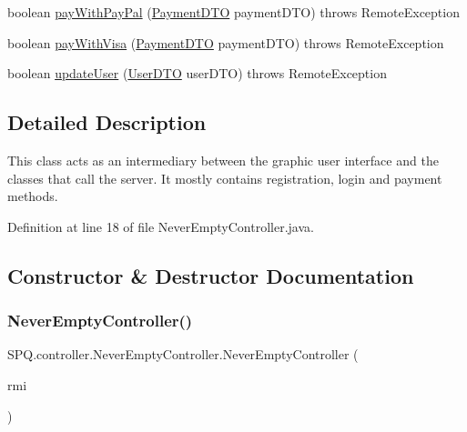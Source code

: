\begin{DoxyCompactItemize}
\item 
boolean \mbox{\hyperlink{class_s_p_q_1_1controller_1_1_never_empty_controller_aefc0dae2c43c2960719176d390f3ad9c}{pay\+With\+Pay\+Pal}} (\mbox{\hyperlink{class_s_p_q_1_1dto_1_1_payment_d_t_o}{Payment\+D\+TO}} payment\+D\+TO)  throws Remote\+Exception 
\item 
boolean \mbox{\hyperlink{class_s_p_q_1_1controller_1_1_never_empty_controller_a79b4d6042b76ad3aee7f11d104d813d6}{pay\+With\+Visa}} (\mbox{\hyperlink{class_s_p_q_1_1dto_1_1_payment_d_t_o}{Payment\+D\+TO}} payment\+D\+TO)  throws Remote\+Exception 
\item 
boolean \mbox{\hyperlink{class_s_p_q_1_1controller_1_1_never_empty_controller_abac74fe36817d476abdd20d19df2092b}{update\+User}} (\mbox{\hyperlink{class_s_p_q_1_1dto_1_1_user_d_t_o}{User\+D\+TO}} user\+D\+TO)  throws Remote\+Exception 
\end{DoxyCompactItemize}


\subsection{Detailed Description}
This class acts as an intermediary between the graphic user interface and the classes that call the server. It mostly contains registration, login and payment methods. 

Definition at line 18 of file Never\+Empty\+Controller.\+java.



\subsection{Constructor \& Destructor Documentation}
\mbox{\label{class_s_p_q_1_1controller_1_1_never_empty_controller_ade8f8a56514a9ef3676a93c79b404be5}} 
\subsubsection{\texorpdfstring{Never\+Empty\+Controller()}{NeverEmptyController()}}
{\footnotesize\ttfamily S\+P\+Q.\+controller.\+Never\+Empty\+Controller.\+Never\+Empty\+Controller (\begin{DoxyParamCaption}\item[{\mbox{\hyperlink{class_s_p_q_1_1remote_1_1_r_m_i_service_locator}{R\+M\+I\+Service\+Locator}}}]{rmi }\end{DoxyParamCaption})}

